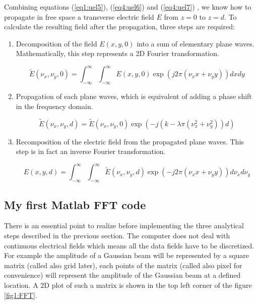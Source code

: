 Combining equations (\ref{eq1:uel5}), (\ref{eq4:uel6}) and (\ref{eq4:uel7}) , we know how to propagate in free space a transverse electric field $E$ from $z = 0$ to $z = d$. To calculate the resulting field after the propagation, three steps are required:
\begin{enumerate}

\item Decomposition of the field $E(x,y,0)$ into a sum of elementary plane waves. Mathematically, this step represents a 2D Fourier transformation.

\begin{equation}
 \widetilde{E}(\nu_x,\nu_y,0) = \int_{-\infty}^{\infty} \int_{-\infty}^{\infty} E(x,y,0) \exp(j 2\pi (\nu_x x + \nu_y y)) dx dy
\label{eq1:uel10}
\end{equation}

\item Propagation of each plane waves, which is equivalent of adding a phase shift in the frequency domain.


\begin{equation}
 \widetilde{E}(\nu_x,\nu_y,d) =  \widetilde{E}(\nu_x,\nu_y,0) \exp(-j (k - \lambda \pi (\nu_x^2 + \nu_y^2))d)
\label{eq1:uel11}
\end{equation}

\item Recomposition of the electric field from the propagated plane waves. This step is in fact an inverse Fourier transformation.

\begin{equation}
 E(x,y,d) = \int_{-\infty}^{\infty} \int_{-\infty}^{\infty}  \widetilde{E}(\nu_x,\nu_y,d) \exp(- j 2\pi (\nu_x x + \nu_y y)) d\nu_x d\nu_y
\label{eq1:uel12}
\end{equation}
\end{enumerate}


\subsection{My first Matlab FFT code}

There is an essential point to realize before implementing the three analytical steps described in the previous section. The computer does not deal with continuous electrical fields which means all the data fields have to be discretized. For example the amplitude of a Gaussian beam will be represented by a square matrix (called also grid later), each points of the matrix (called also pixel for convenience) will represent the amplitude of the Gaussian beam at a defined location. A 2D plot of such a matrix is shown in the top left corner of the figure \ref{fig1:FFT}.

